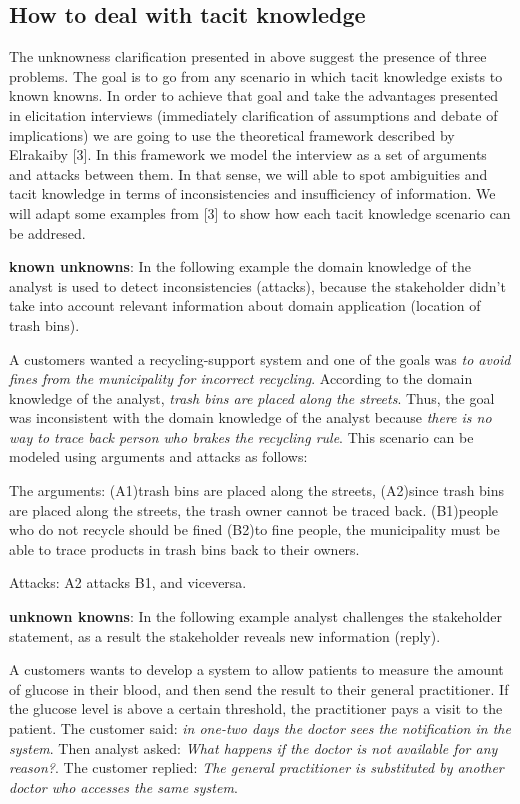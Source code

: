 \documentclass[]{llncs}
\begin{document}
\hypertarget{how-to-deal-with-tacit-knowledge}{%
\subsection{How to deal with tacit
knowledge}\label{how-to-deal-with-tacit-knowledge}}

The unknowness clarification presented in above suggest the presence of
three problems. The goal is to go from any scenario in which tacit
knowledge exists to known knowns. In order to achieve that goal and take
the advantages presented in elicitation interviews (immediately
clarification of assumptions and debate of implications) we are going to
use the theoretical framework described by Elrakaiby {[}3{]}. In this
framework we model the interview as a set of arguments and attacks
between them. In that sense, we will able to spot ambiguities and tacit
knowledge in terms of inconsistencies and insufficiency of information.
We will adapt some examples from {[}3{]} to show how each tacit
knowledge scenario can be addresed.

\textbf{known unknowns}: In the following example the domain knowledge
of the analyst is used to detect inconsistencies (attacks), because the
stakeholder didn't take into account relevant information about domain
application (location of trash bins).

A customers wanted a recycling-support system and one of the goals was
\emph{to avoid fines from the municipality for incorrect recycling}.
According to the domain knowledge of the analyst, \emph{trash bins are
placed along the streets}. Thus, the goal was inconsistent with the
domain knowledge of the analyst because \emph{there is no way to trace
back person who brakes the recycling rule}. This scenario can be modeled
using arguments and attacks as follows:

The arguments: (A1)trash bins are placed along the streets, (A2)since
trash bins are placed along the streets, the trash owner cannot be
traced back. (B1)people who do not recycle should be fined (B2)to fine
people, the municipality must be able to trace products in trash bins
back to their owners.

Attacks: A2 attacks B1, and viceversa.

\textbf{unknown knowns}: In the following example analyst challenges the
stakeholder statement, as a result the stakeholder reveals new
information (reply).

A customers wants to develop a system to allow patients to measure the
amount of glucose in their blood, and then send the result to their
general practitioner. If the glucose level is above a certain threshold,
the practitioner pays a visit to the patient. The customer said:
\emph{in one-two days the doctor sees the notification in the system}.
Then analyst asked: \emph{What happens if the doctor is not available
for any reason?}. The customer replied: \emph{The general practitioner
is substituted by another doctor who accesses the same system}.
\end{document}
